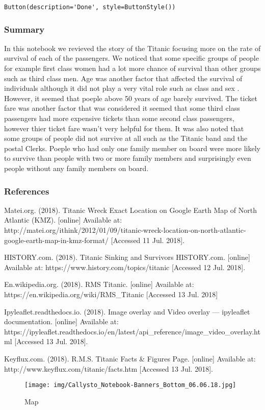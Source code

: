\documentclass[11pt]{article}
\makeatletter
\def\maxwidth{\ifdim\Gin@nat@width>\linewidth\linewidth
    \else\Gin@nat@width\fi}
\let\Oldincludegraphics\includegraphics
\renewcommand{\includegraphics}[1]{\Oldincludegraphics[width=.8\maxwidth]{#1}}
\makeatother
\begin{document}
    \begin{verbatim}
Button(description='Done', style=ButtonStyle())
    \end{verbatim}

    
    \subsubsection{Summary}\label{summary}

In this notebook we revieved the story of the Titanic focusing more on
the rate of survival of each of the passengers. We noticed that some
specific groups of people for example first class women had a lot more
chance of survival than other groups such as third class men. Age was
another factor that affected the survival of individuals although it did
not play a very vital role such as class and sex . However, it seemed
that poeple above 50 years of age barely survived. The ticket fare was
another factor that was considered it seemed that some third class
passengers had more expensive tickets than some second class passengers,
however thier ticket fare wasn't very helpful for them. It was also
noted that some groups of people did not survive at all such as the
Titanic band and the postal Clerks. Poeple who had only one family
member on board were more likely to survive than people with two or more
family members and surprisingly even people without any family members
on board.

    \subsubsection{References}\label{references}

Matei.org. (2018). Titanic Wreck Exact Location on Google Earth Map of
North Atlantic (KMZ). {[}online{]} Available at:
http://matei.org/ithink/2012/01/09/titanic-wreck-location-on-north-atlantic-google-earth-map-in-kmz-format/
{[}Accessed 11 Jul. 2018{]}.

HISTORY.com. (2018). Titanic \textbar{} Sinking and Survivors \textbar{}
HISTORY.com. {[}online{]} Available at:
https://www.history.com/topics/titanic {[}Accessed 12 Jul. 2018{]}.

En.wikipedia.org. (2018). RMS Titanic. {[}online{]} Available at:
https://en.wikipedia.org/wiki/RMS\_Titanic {[}Accessed 13 Jul. 2018{]}

Ipyleaflet.readthedocs.io. (2018). Image overlay and Video overlay ---
ipyleaflet documentation. {[}online{]} Available at:
https://ipyleaflet.readthedocs.io/en/latest/api\_reference/image\_video\_overlay.html
{[}Accessed 13 Jul. 2018{]}.

Keyflux.com. (2018). R.M.S. Titanic Facts \& Figures Page. {[}online{]}
Available at: http://www.keyflux.com/titanic/facts.htm {[}Accessed 13
Jul. 2018{]}.

    \begin{figure}
\centering
\texttt{[image: img/Callysto\_Notebook-Banners\_Bottom\_06.06.18.jpg]}
\caption{Map}
\end{figure}


    
    
    
    
\end{document}
